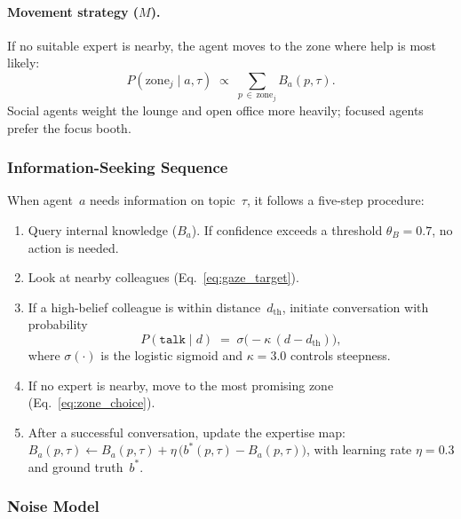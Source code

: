 \documentclass[journal]{IEEEtran}
\begin{document}
\paragraph{Movement strategy ($M$).}
If no suitable expert is nearby, the agent moves to the zone where
help is most likely:
%
\begin{equation}
  P(\text{zone}_j \mid a, \tau)
  \;\propto\;
  \sum_{p \,\in\, \text{zone}_j} B_a(p, \tau).
  \label{eq:zone_choice}
\end{equation}
%
Social agents weight the lounge and open office more heavily;
focused agents prefer the focus booth.

\subsubsection{Information-Seeking Sequence}

When agent~$a$ needs information on topic~$\tau$, it follows a
five-step procedure:
%
\begin{enumerate}
  \item Query internal knowledge ($B_a$). If confidence exceeds a
        threshold $\theta_B = 0.7$, no action is needed.
  \item Look at nearby colleagues (Eq.~\ref{eq:gaze_target}).
  \item If a high-belief colleague is within distance~$d_{\text{th}}$,
        initiate conversation with probability
        \begin{equation}
          P(\texttt{talk} \mid d)
          \;=\; \sigma\!\bigl(-\kappa\,(d - d_{\text{th}})\bigr),
          \label{eq:talk_prob}
        \end{equation}
        where $\sigma(\cdot)$ is the logistic sigmoid and
        $\kappa = 3.0$ controls steepness.
  \item If no expert is nearby, move to the most promising zone
        (Eq.~\ref{eq:zone_choice}).
  \item After a successful conversation, update the expertise map:
        $B_a(p, \tau) \leftarrow B_a(p, \tau)
         + \eta\,\bigl(b^{*}(p,\tau) - B_a(p,\tau)\bigr)$,
        with learning rate $\eta = 0.3$ and ground truth~$b^{*}$.
\end{enumerate}

\subsubsection{Noise Model}
\end{document}
